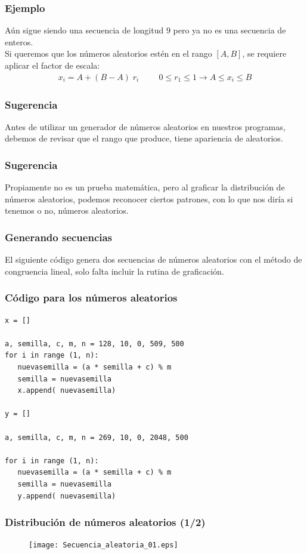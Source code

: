 \documentclass[12pt]{beamer}
\begin{document}
\begin{frame}
\frametitle{Ejemplo}
Aún sigue siendo una secuencia de longitud $9$ pero ya no es una secuencia de enteros.
\\
\bigskip
\pause
Si queremos que los números aleatorios estén en el rango $[A, B]$, se requiere aplicar el factor de escala:
\pause
\begin{align*}
x_{i} = A + (B - A) \; r_{i} \hspace{1cm} 0 \leq r_{1} \leq 1 \rightarrow A \leq x_{i} \leq B
\end{align*}
\end{frame}
\begin{frame}
\frametitle{Sugerencia}
Antes de utilizar un generador de números aleatorios en nuestros programas, debemos de revisar que el rango que produce, tiene apariencia de aleatorios.
\end{frame}
\begin{frame}
\frametitle{Sugerencia}
Propiamente no es un prueba matemática, pero al graficar la distribución de números aleatorios, podemos reconocer ciertos patrones, con lo que nos diría si tenemos o no, números aleatorios.
\end{frame}
\begin{frame}
\frametitle{Generando secuencias}
El siguiente código genera dos secuencias de números aleatorios con el método de congruencia lineal, solo falta incluir la rutina de graficación.
\end{frame}
\begin{frame}
\frametitle{Código para los números aleatorios}
\begin{lstlisting}[caption=Código distribución, style=FormattedNumber, basicstyle=\linespread{1.1}\ttfamily=\small, columns=fullflexible]
x = []

a, semilla, c, m, n = 128, 10, 0, 509, 500
for i in range (1, n):
   nuevasemilla = (a * semilla + c) % m
   semilla = nuevasemilla
   x.append( nuevasemilla)

y = []

a, semilla, c, m, n = 269, 10, 0, 2048, 500

for i in range (1, n):
   nuevasemilla = (a * semilla + c) % m
   semilla = nuevasemilla
   y.append( nuevasemilla)
\end{lstlisting}
\end{frame}
\begin{frame}[fragile]
\frametitle{Distribución de números aleatorios (1/2)}
\begin{figure}
  \centering
  \texttt{[image: Secuencia\_aleatoria\_01.eps]}
\end{figure}
\end{frame}
\end{document}
